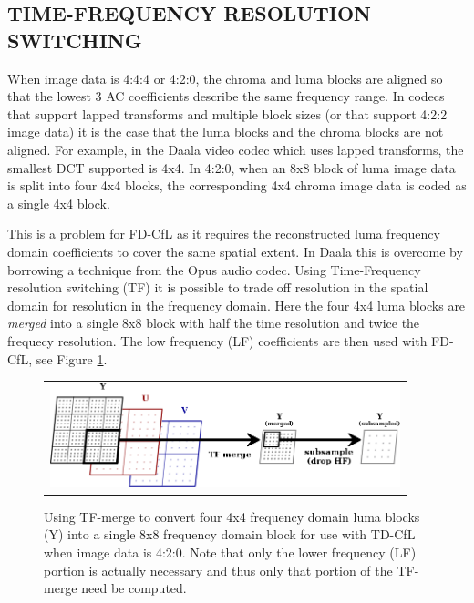 \documentclass[a4paper]{spie}  %
\begin{document}
\subsection{TIME-FREQUENCY RESOLUTION SWITCHING}

When image data is 4:4:4 or 4:2:0, the chroma and luma blocks are aligned so
 that the lowest 3 AC coefficients describe the same frequency range.
In codecs that support lapped transforms and multiple block sizes (or that
 support 4:2:2 image data) it is the case that the luma blocks and the chroma
 blocks are not aligned.
For example, in the Daala video codec which uses lapped transforms, the
 smallest DCT supported is 4x4.
In 4:2:0, when an 8x8 block of luma image data is split into four 4x4 blocks,
 the corresponding 4x4 chroma image data is coded as a single 4x4 block.

This is a problem for FD-CfL as it requires the reconstructed luma frequency
 domain coefficients to cover the same spatial extent.
In Daala this is overcome by borrowing a technique from the Opus audio
 codec\cite{valin2013high}.
Using Time-Frequency resolution switching (TF) it is possible to trade off
 resolution in the spatial domain for resolution in the frequency domain.
Here the four 4x4 luma blocks are {\em merged} into a single 8x8 block with
 half the time resolution and twice the frequecy resolution.
The low frequency (LF) coefficients are then used with FD-CfL, see
 Figure \ref{fig:tf}.

\begin{figure}[h]
\begin{center}
\begin{tabular}{c}
\includegraphics[natwidth=799,natheight=237,width=4in]{CfL-TF.png}
\end{tabular}
\end{center}
\caption[example]{\label{fig:tf} Using TF-merge to convert four 4x4 frequency
 domain luma blocks (Y) into a single 8x8 frequency domain block for use with
 TD-CfL when image data is 4:2:0.  Note that only the lower frequency (LF)
 portion is actually necessary and thus only that portion of the TF-merge need
 be computed.}
\end{figure}
\end{document}
